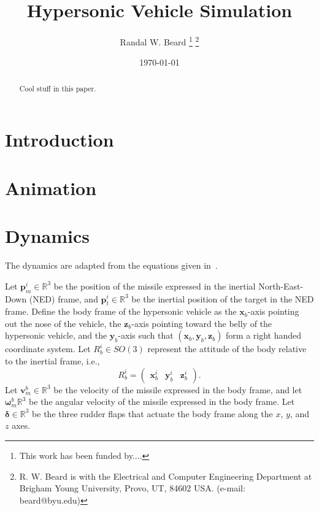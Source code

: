 \documentclass{article}
\title{Hypersonic Vehicle Simulation}
\author{
    Randal W. Beard
    \thanks{
        This work has been funded by....
    }
    \thanks{
        R. W. Beard is with the Electrical and Computer Engineering Department at Brigham Young University, Provo, UT, 84602 USA.  (e-mail: beard@byu.edu)
    }
}
\date{\today}
\newcommand{\pbf}{\mathbf{p}}
\newcommand{\vbf}{\mathbf{v}}
\newcommand{\xbf}{\mathbf{x}}
\newcommand{\ybf}{\mathbf{y}}
\newcommand{\zbf}{\mathbf{z}}
\newcommand{\deltabf}{\boldsymbol{\delta}}
\newcommand{\omegabf}{\boldsymbol{\omega}}
\begin{document}
\maketitle
\thispagestyle{empty}

    \begin{abstract}
        Cool stuff in this paper.
    \end{abstract}

\section{Introduction}

\section{Animation}

\section{Dynamics}
The dynamics are adapted from the equations given in~\cite{LiZhangZhang23}.

Let $\pbf_m^i\in\mathbb{R}^3$ be the position of the missile expressed in the inertial North-East-Down (NED) frame, and $\pbf_t^i\in\mathbb{R}^3$ be the inertial position of the target in the NED frame.  Define the body frame of the hypersonic vehicle as the $\xbf_b$-axis pointing out the nose of the vehicle, the $\zbf_b$-axis pointing toward the belly of the hypersonic vehicle, and the $\ybf_b$-axis such that $(\xbf_b,\ybf_b,\zbf_b)$ form a right handed coordinate system.  Let $R_b^i\in SO(3)$ represent the attitude of the body relative to the inertial frame, i.e.,
\[
R_b^i = \begin{pmatrix} \xbf_b^i & \ybf_b^i & \zbf_b^i \end{pmatrix}.
\]
Let $\vbf_m^b\in\mathbb{R}^3$ be the velocity of the missile expressed in the body frame, and let $\omegabf_m^b\mathbb{R}^3$ be the angular velocity of the missile expressed in the body frame.  Let $\deltabf\in\mathbb{R}^3$ be the three rudder flaps that actuate the body frame along the $x$, $y$, and $z$ axes.  
\end{document}
